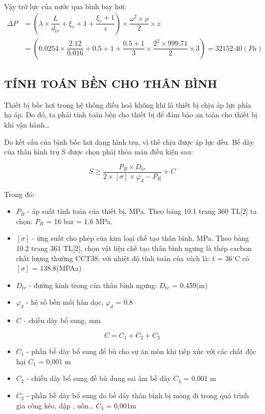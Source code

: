 Vậy trở lực của nước qua bình bay hơi:
\begin{equation*}
	\begin{split}
		\Delta P &= \left(\lambda\times\dfrac{L}{d_{tr}} +\xi_{v} + 1 + \dfrac{\xi_{v} + 1}{z}\right)\times \dfrac{\omega^2\times\rho}{2}\times z\\
		&=  (0.0254 \times \dfrac{2.12}{0.016}+0.5+1+ \dfrac{0.5+1}{3} \times \dfrac{2^2 \times 999.71}{2} \times 3) = 32152.40(Pa)
	\end{split}
\end{equation*}

\subsection{TÍNH TOÁN BỀN CHO THÂN BÌNH}
Thiết bị bốc hơi trong hệ thống điều hoà không khí là thiết bị chịu áp lực phía hạ áp. Do đó, ta phải tính toán bền cho thiết bị để đảm bảo an toàn cho thiết bị khi vận hành…

Do kết cấu của bình bốc hơi dạng hình trụ, vì thế chịu được áp lực đều. Bề dày của thân hình trụ S được chọn phải thỏa mãn điều kiện sau:

\begin{equation*}
	S \geq \dfrac{P_{R}\times D_{tr}}{2\times [\sigma]\times\varphi_{d} - P_{R}} + C
\end{equation*}

Trong đó:
\begin{itemize}
	\item $P_{R}$ - áp suất tính toán của thiết bị, MPa. Theo bảng 10.1 trang 360 TL[2] ta chọn: $P_{R}$ = 16 bar = 1.6 MPa.
	\item $[\sigma]$ - ứng suất cho phép của kim loại chế tạo thân bình, MPa. Theo bảng 10.2 trang 361 TL[2], chọn vật liệu chế tạo thân bình ngưng là thép cacbon chất lượng thường CCT38, với nhiệt độ tính toán của vách là: t = 36$^{\circ}$C có $[\sigma]$ = 138.8(MPAa)
	\item $D_{tr}$ - đường kính trong của thân bình ngưng: $D_{tr}$ = 0.459(m)
	\item $\varphi_{d}$ - hệ số bền mối hàn dọc, $\varphi_{d}$ = 0.8
	\item $C$ - chiều dày bổ sung, mm
\end{itemize}
\begin{equation*}
	C = C_{1} + C_{2} + C_{3}
\end{equation*}
\begin{itemize}
	\item $C_{1}$ - phần bề dày bổ sung để bù cho sự ăn mòn khi tiếp xúc với các	chất độc hại $C_{1}$ = 0,001 m
	\item $C_{2}$ - chiều dày bổ sung đề bù dung sai âm bề dày $C_{4}$ = 0,001 m
	\item $C_{3}$ - phần bề dày bổ sung do bề dày thân bình bị mỏng đi trong quá trình gia công kéo, dập , uốn… $C_{3}$ = 0,001m
\end{itemize}

